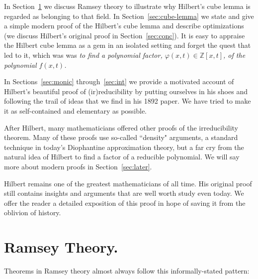 \documentclass{article}
\theoremstyle{plain}
\theoremstyle{definition}
\newcommand{\Zed}{\mathbb{Z}}   %
\begin{document}
In Section~\ref{sec:ramsey} we discuss Ramsey theory to illustrate why
Hilbert's cube lemma is regarded as 
belonging to that field.
In Section~\ref{sec:cube-lemma} we state and give a simple modern proof of the Hilbert's cube lemma and describe optimizations
(we discuss Hilbert's original proof in Section~\ref{sec:conc}).
It is easy to appraise the Hilbert cube lemma as a gem in an isolated setting and
forget the quest that led to it, which was was \emph{to find a
polynomial factor, $\varphi(x,t) \in \Zed[x,t]$, of the polynomial
$f(x,t)$.}

In Sections~\ref{sec:monic} through~\ref{sec:int} 
we provide a motivated account of Hilbert's beautiful proof of (ir)reducibility by
putting ourselves in his shoes and following the trail of ideas that
we find in his 1892 paper. We have tried to make it as self-contained and elementary as possible.

After Hilbert, many mathematicians offered other proofs of the
irreducibility theorem. Many of these
proofs use so-called ``density" arguments, a standard technique in
today's Diophantine approximation theory, but a far cry from the
natural idea of Hilbert to find a factor of a reducible polynomial. We
will say more about modern proofs in Section~\ref{sec:later}.

Hilbert remains one of the greatest mathematicians of all time. His
original proof still contains insights and arguments that are well
worth study even today. We offer the reader a detailed exposition of
this proof in hope of saving it from the oblivion of history.



\section{Ramsey Theory.}
\label{sec:ramsey}


Theorems in Ramsey theory 
almost always follow this informally-stated pattern:
\end{document}
